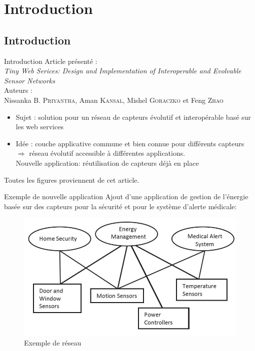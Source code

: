 
\section{Introduction}
\subsection{Introduction}
\begin{frame}{Introduction}
Article présenté :\\
\alert{\textit{Tiny Web Serices: Design and Implementation of Interoperable and Evolvable Sensor Networks}}\\
Auteurs :\\
Nissanka B. \textsc{Priyantha}, Aman \textsc{Kansal}, Mishel \textsc{Goraczko} et Feng \textsc{Zhao}
\begin{itemize}
\item Sujet : solution pour un réseau de capteurs évolutif et interopérable basé sur les web services
\item Idée : couche applicative commune et bien connue pour différents capteurs $\Rightarrow$ réseau évolutif accessible à différentes applications. \\Nouvelle application: réutilisation de capteurs déjà en place
\end{itemize}
\vspace{5mm}
\small{Toutes les figures proviennent de cet article.}
\end{frame}

\begin{frame}{Exemple de nouvelle application}
Ajout d'une application de gestion de l'énergie basée sur des capteurs pour la sécurité et pour le système d'alerte médicale: 
\begin{figure}
  \centering
  \includegraphics[scale=0.4]{figures/exemple.jpg}
  \caption{Exemple de réseau}
 \end{figure} 
\end{frame}


